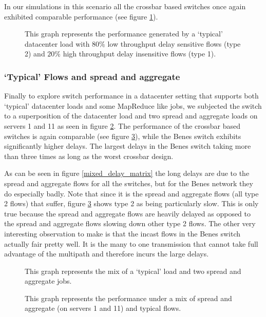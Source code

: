 \documentclass{IEEEtran}%
\begin{document}
In our simulations in this scenario all the crossbar based switches once again exhibited comparable performance (see figure \ref{typ_delays}).


\begin{figure}%
	\caption{This graph represents the performance generated by a `typical' datacenter load with $80\%$ low throughput delay sensitive flows (type 2) and $20\%$ high throughput delay insensitive flows (type 1).}
	\label{typ_delays}
\end{figure}

\subsubsection{`Typical' Flows and spread and aggregate}
Finally to explore switch performance in a datacenter setting that supports both  `typical' datacenter loads and some MapReduce like jobs, we subjected the switch to a superposition of the datacenter load and two spread and aggregate loads on servers 1 and 11 as seen in figure \ref{typ_mult2}.  The performance of the crossbar based switches is again comparable (see figure \ref{typ_mult2_delays}), while the Benes switch exhibits significantly higher delays. The largest delays in the Benes switch taking more than three times as long as the worst crossbar design.

As can be seen in figure \ref{mixed_delay_matrix} the long delays are due to the spread and aggregate flows for all the switches, but for the Benes network they do especially badly.  Note that since it is the spread and aggregate flows (all type 2 flows) that suffer, figure \ref{typ_mult2_delays} shows type 2 as being particularly slow.  This is only true because the spread and aggregate flows are heavily delayed as opposed to the spread and aggregate flows slowing down other type 2 flows.  The other very interesting observation to make is that the incast flows in the Benes switch actually fair pretty well.  It is the many to one transmission that cannot take full advantage of the multipath and therefore incurs the large delays.
\begin{figure}%
	\caption{This graph represents the mix of a `typical' load and two spread and aggregate jobs.}
	\label{typ_mult2}
\end{figure}

\begin{figure}%
	\caption{This graph represents the performance under a mix of spread and aggregate (on servers 1 and 11) and typical flows.}
	\label{typ_mult2_delays}
\end{figure}
\end{document}
